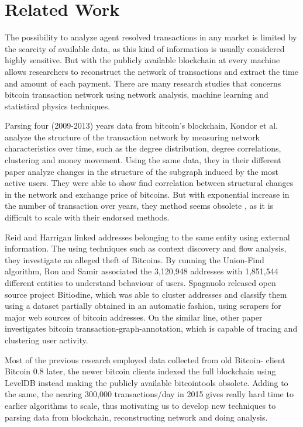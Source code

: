 \section{Related Work}
The possibility to analyze agent resolved transactions in any market is limited by the scarcity of available data, as this kind of information is usually considered highly sensitive. But with the publicly available blockchain at every machine allows researchers to reconstruct the network of transactions and extract the time and amount of each payment. There are many research studies that concerns bitcoin transaction network using network analysis, machine learning and statistical physics techniques.

Parsing four (2009-2013) years data from bitcoin's  blockchain, Kondor et al. \citep{Csabai2014}  analyze the structure of the transaction network by measuring network characteristics over time, such as the degree distribution, degree correlations, clustering and money movement. Using the same data, they in their different paper \citep{Kondor2014} analyze changes in the structure of the subgraph induced by the most active users. They were  able to show find correlation between structural changes in the network and exchange price of bitcoins. But with exponential increase in the number of transaction over years, they method seems obsolete , as it is difficult to scale with their endorsed methods.

Reid and Harrigan \citep{Reid2013} linked addresses belonging to the same entity using external information. The using techniques such as context discovery and flow analysis, they investigate an alleged theft of Bitcoins. By running the Union-Find algorithm, Ron and Samir \citep{Ron2013}  associated the 3,120,948 addresses with 1,851,544 different entities to understand behaviour of users. Spagnuolo \citep{Spagnuolo2013} released open source project Bitiodine, which was able to cluster addresses and classify them using a dataset partially obtained in an automatic fashion, using scrapers for major web sources of bitcoin addresses. On the similar line, other paper \citep{Fleder2015} investigates bitcoin transaction-graph-annotation, which is capable of tracing and clustering user activity.

Most of the  previous research employed data collected from old Bitcoin- client Bitcoin 0.8 later, the newer bitcoin clients indexed the full blockchain using LevelDB instead making the publicly available bitcointools obsolete. Adding to the same, the nearing 300,000 transactions/day in 2015 gives really hard time to earlier algorithms to scale, thus motivating us to develop new techniques to parsing data from blockchain, reconstructing network and doing analysis.

